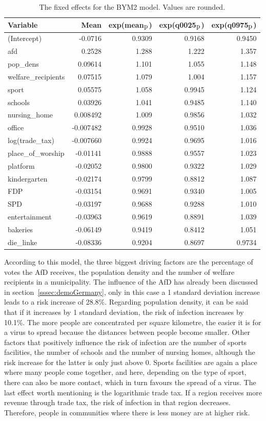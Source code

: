 \begin{table}[H] 
\caption{The fixed effects for the BYM2 model. Values are rounded. \label{fixedAllGermany}}
\begin{tabular}{l r r r r}
\toprule
\textbf{Variable}	& \textbf{Mean}	& \textbf{exp(mean$_{\hbox{p}}$)} & \textbf{exp(q0025$_{\hbox{p}}$)} & \textbf{exp(q0975$_{\hbox{p}}$)} \\
\midrule
(Intercept) & -0.0716 & 0.9309 & 0.9168 & 0.9450 \\
afd & 0.2528 & 1.288 & 1.222 & 1.357 \\
pop\_dens & 0.09614 & 1.101 & 1.055 & 1.148 \\
welfare\_recipients & 0.07515 & 1.079 & 1.004 & 1.157 \\
sport & 0.05575 & 1.058 & 0.9945 & 1.124 \\
schools & 0.03926 & 1.041 & 0.9485 & 1.140 \\
nursing\_home & 0.008492 & 1.009 & 0.9856 & 1.032 \\
office & -0.007482 & 0.9928 & 0.9510 & 1.036 \\
log(trade\_tax) & -0.007660 & 0.9924 & 0.9695 & 1.016 \\
place\_of\_worship & -0.01141 & 0.9888 & 0.9557 & 1.023 \\
platform & -0.02052 & 0.9800 & 0.9322 & 1.029 \\
kindergarten & -0.02174 &  0.9799 & 0.8812 & 1.087 \\
FDP & -0.03154 & 0.9691 & 0.9340 & 1.005 \\
SPD & -0.03197 & 0.9688 & 0.9288 & 1.010 \\
entertainment & -0.03963 & 0.9619 & 0.8891 & 1.039 \\
bakeries & -0.06149 & 0.9419 & 0.8412 & 1.051 \\
die\_linke & -0.08336 &  0.9204 & 0.8697 & 0.9734\\
\bottomrule
\end{tabular}
\end{table}
According to this model, the three biggest driving factors are the percentage of votes the AfD receives, the population density and the number of welfare recipients in a municipality. The influence of the AfD has already been discussed in section~\ref{sssec:demoGermany}, only in this case a 1 standard deviation increase leads to a risk increase of 28.8\%. Regarding population density, it can be said that if it increases by 1 standard deviation, the risk of infection increases by 10.1\%. The more people are concentrated per square kilometre, the easier it is for a virus to spread because the distances between people become smaller. Other factors that positively influence the risk of infection are the number of sports facilities, the number of schools and the number of nursing homes, although the risk increase for the latter is only just above 0. Sports facilities are again a place where many people come together, and here, depending on the type of sport, there can also be more contact, which in turn favours the spread of a virus. The last effect worth mentioning is the logarithmic trade tax. If a region receives more revenue through trade tax, the risk of infection in that region decreases. Therefore, people in communities where there is less money are at higher risk. 
